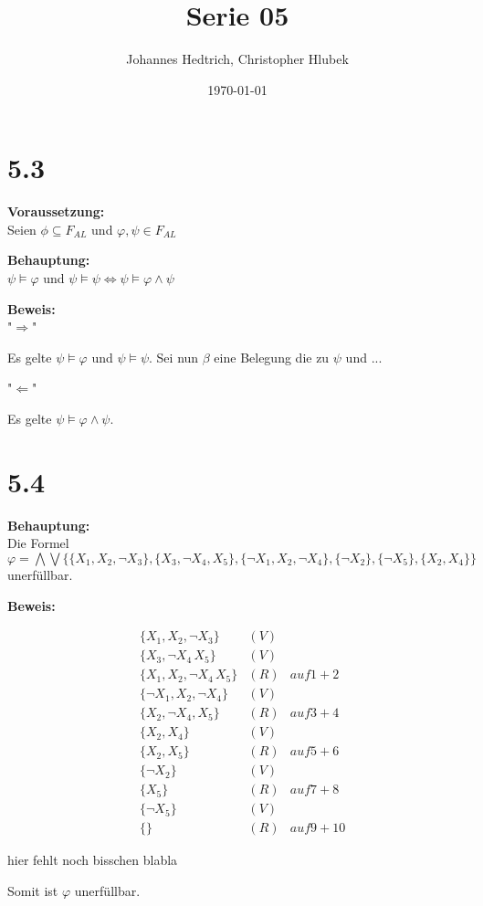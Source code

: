 \documentclass[12pt,a4paper]{scrartcl}
\title{Serie 05}
\author{Johannes Hedtrich, Christopher Hlubek}
\date{\today}
\begin{document}
\section*{5.3}

\textbf{Voraussetzung:}\\ 
Seien $\phi \subseteq F_{AL}$ und $\varphi, \psi \in F_{AL}$

\noindent
\textbf{Behauptung:}\\ 

$\psi \models \varphi$ und $\psi \models \psi \Leftrightarrow \psi \models \varphi \wedge \psi$

\noindent
\textbf{Beweis:}\\
"$\Rightarrow$"

Es gelte $\psi \models \varphi$ und $\psi \models \psi$. Sei nun $\beta$ eine Belegung die zu $\psi$ und ...

\noindent
"$\Leftarrow$"

Es gelte $\psi \models \varphi \wedge \psi$.



\section*{5.4}

\textbf{Behauptung:}\\ Die Formel $\varphi = \bigwedge \bigvee\{\{X_1, X_2, \neg X_3\},\{X_3, \neg X_4, X_5\},\{\neg X_1, X_2, \neg X_4\}, \{\neg X_2\},\{\neg X_5\},\{X_2, X_4\}\}$ unerfüllbar.

\noindent
\textbf{Beweis: }

\begin{align}
  & \{X_1, X_2, \neg X_3\} & (V)\\
  & \{X_3, \neg X_4\, X_5\} & (V)\\
  & \{X_1, X_2, \neg X_4\, X_5\} & (R) & auf 1 + 2\\
  & \{\neg X_1, X_2, \neg X_4\} & (V)\\
  & \{X_2, \neg X_4, X_5\} & (R) & auf 3 + 4\\
  & \{X_2, X_4\} & (V)\\
  & \{X_2, X_5\} & (R) & auf 5 + 6\\
  & \{\neg X_2\} & (V)\\
  & \{X_5\} & (R) & auf 7 + 8\\
  & \{\neg X_5\} & (V)\\
  & \{\} & (R) & auf 9 + 10
\end{align}

hier fehlt noch bisschen blabla

Somit ist $\varphi$ unerfüllbar.
\end{document}
